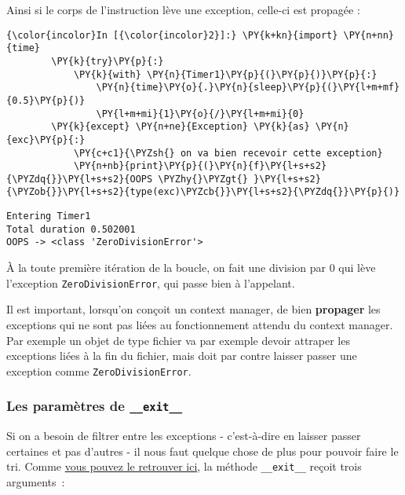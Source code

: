     Ainsi si le corps de l'instruction lève une exception, celle-ci est
propagée :

    \begin{Verbatim}[commandchars=\\\{\}]
{\color{incolor}In [{\color{incolor}2}]:} \PY{k+kn}{import} \PY{n+nn}{time}
        \PY{k}{try}\PY{p}{:}
            \PY{k}{with} \PY{n}{Timer1}\PY{p}{(}\PY{p}{)}\PY{p}{:}
                \PY{n}{time}\PY{o}{.}\PY{n}{sleep}\PY{p}{(}\PY{l+m+mf}{0.5}\PY{p}{)}
                \PY{l+m+mi}{1}\PY{o}{/}\PY{l+m+mi}{0}
        \PY{k}{except} \PY{n+ne}{Exception} \PY{k}{as} \PY{n}{exc}\PY{p}{:}
            \PY{c+c1}{\PYZsh{} on va bien recevoir cette exception}
            \PY{n+nb}{print}\PY{p}{(}\PY{n}{f}\PY{l+s+s2}{\PYZdq{}}\PY{l+s+s2}{OOPS \PYZhy{}\PYZgt{} }\PY{l+s+s2}{\PYZob{}}\PY{l+s+s2}{type(exc)\PYZcb{}}\PY{l+s+s2}{\PYZdq{}}\PY{p}{)}
\end{Verbatim}


    \begin{Verbatim}[commandchars=\\\{\}]
Entering Timer1
Total duration 0.502001
OOPS -> <class 'ZeroDivisionError'>

    \end{Verbatim}

    À la toute première itération de la boucle, on fait une division par 0
qui lève l'exception \texttt{ZeroDivisionError}, qui passe bien à
l'appelant.

Il est important, lorsqu'on conçoit un context manager, de bien
\textbf{propager} les exceptions qui ne sont pas liées au fonctionnement
attendu du context manager. Par exemple un objet de type fichier va par
exemple devoir attraper les exceptions liées à la fin du fichier, mais
doit par contre laisser passer une exception comme
\texttt{ZeroDivisionError}.

    \hypertarget{les-paramuxe8tres-de-__exit__}{%
\subsubsection{\texorpdfstring{Les paramètres de
\texttt{\_\_exit\_\_}}{Les paramètres de \_\_exit\_\_}}\label{les-paramuxe8tres-de-__exit__}}

    Si on a besoin de filtrer entre les exceptions - c'est-à-dire en laisser
passer certaines et pas d'autres - il nous faut quelque chose de plus
pour pouvoir faire le tri. Comme
\href{https://docs.python.org/3/reference/datamodel.html\#with-statement-context-managers}{vous
pouvez le retrouver ici}, la méthode \texttt{\_\_exit\_\_} reçoit trois
arguments~:


